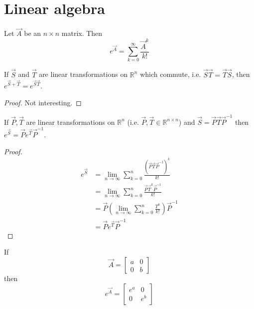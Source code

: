 \section{Linear algebra}
\begin{definition}
	Let $\vec A$ be an $n \times n$ matrix. Then
	\begin{equation}
		e^{\vec A} = \sum_{k = 0}^\infty \frac{\vec A^k}{k!}
	\end{equation}
\end{definition}

\begin{proposition} %
	\label{prop:la:commute}
	If $\vec S$ and $\vec T$ are linear transformations on $\mathbb R^n$ which commute, i.e. $\vec S \vec T = \vec T \vec S$, then $e^{\vec S + \vec T} = e^{\vec S \vec T}$.
\end{proposition}

\begin{proof}
	Not interesting.
\end{proof}

\begin{proposition} %
	\label{prop:la:ptp}
	If $\vec P, \vec T$ are linear transformations on $\mathbb R^n$ (i.e. $\vec P, \vec T \in \mathbb R^{n \times n}$) and $\vec S = \vec P \vec T \vec P^{-1}$ then $e^{\vec S} = \vec P e^{\vec T} \vec P^{-1}$.
\end{proposition}

\begin{proof}
	\begin{align*}
		e^{\vec S} 	&= \lim_{n \to \infty} \sum_{k = 0}^n \frac{(\vec P \vec T \vec P^{-1})^k}{k!} \\
						&= \lim_{n \to \infty} \sum_{k = 0}^n \frac{\vec P \vec T^k \vec P^{-1}}{k!} \\
						&= \vec P \left(\lim_{n \to \infty} \sum_{k = 0}^n \frac{T^k}{k!} \right) \vec P^{-1} \\
						&= \vec P e^{\vec T} \vec P^{-1}
	\end{align*}
\end{proof}

\begin{proposition}
	\label{prop:la:distinct}
	If
	\begin{equation*}
		\vec A =
		\begin{bmatrix}
			a & 0 \\
			0 & b
		\end{bmatrix}
	\end{equation*}
	then
	\begin{equation*}
		e^{\vec A} =
		\begin{bmatrix}
			e^a & 0 \\
			0 & e^b
		\end{bmatrix}
	\end{equation*}
\end{proposition}

